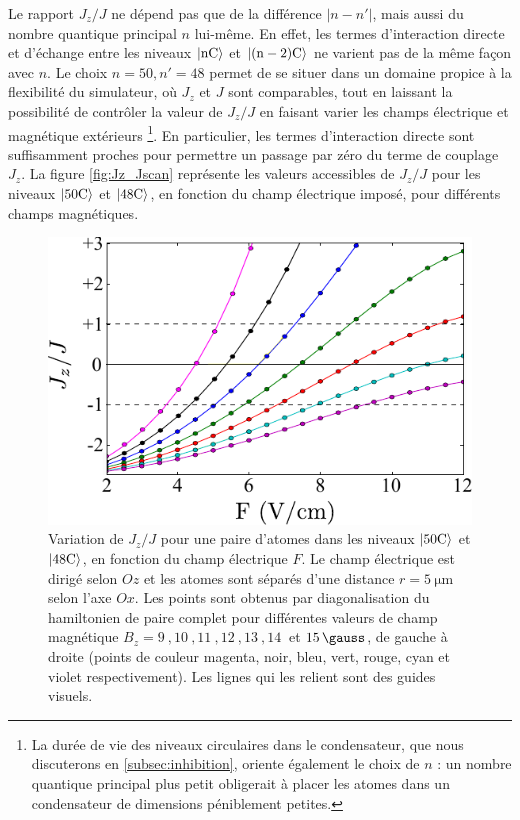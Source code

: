 Le rapport $J_z/J$ %
ne dépend pas que de la différence $|n-n'|$, mais aussi du nombre quantique principal $n$ lui-même.
En effet, les termes d'interaction directe et d'échange entre les niveaux $\ket{\mathrm{nC}}$ et $\ket{\mathrm{(n-2)C}}$ ne varient pas de la même façon avec $n$.
Le choix $n=50,n'=48$ permet de se situer dans un domaine propice à la flexibilité du simulateur, où $J_z$ et $J$ sont comparables, tout en laissant la possibilité de contrôler la valeur de $J_z/J$ en faisant varier les champs électrique et magnétique extérieurs
\footnote{
La durée de vie des niveaux circulaires dans le condensateur, que nous discuterons en \ref{subsec:inhibition}, oriente également le choix de $n$ : un nombre quantique principal plus petit obligerait à placer les atomes dans un condensateur de dimensions péniblement petites.
}.
En particulier, les termes d'interaction directe sont suffisamment proches pour permettre un passage par zéro du terme de couplage $J_z$.
La figure \eqref{fig:Jz_Jscan} représente les valeurs accessibles de $J_z/J$ pour les niveaux $\ket{\mathrm{50C}}$ et $\ket{\mathrm{48C}}$, en fonction du champ électrique imposé, pour différents champs magnétiques.
%
\begin{figure}[!h]
\centering
\includegraphics[width=0.7\linewidth]{figures/circsim/Jz_Jscan}
\caption[Variation de $J_z/J$]{
Variation de $J_z/J$ pour une paire d'atomes dans les niveaux $\ket{\mathrm{50C}}$ et $\ket{\mathrm{48C}}$, en fonction du champ électrique $F$.
Le champ électrique est dirigé selon $Oz$ et les atomes sont séparés d'une distance $r=\SI{5}{\um}$ selon l'axe $Ox$.
Les points sont obtenus par diagonalisation du hamiltonien de paire complet pour différentes valeurs de champ magnétique $B_z=\SI{9}{},\SI{10}{},\SI{11}{},\SI{12}{},\SI{13}{},\SI{14}{}$ et $\SI{15}{\gauss}$, de gauche à droite (points de couleur magenta, noir, bleu, vert, rouge, cyan et violet respectivement).
Les lignes qui les relient sont des guides visuels.
}
\label{fig:Jz_Jscan}
\end{figure}
%

